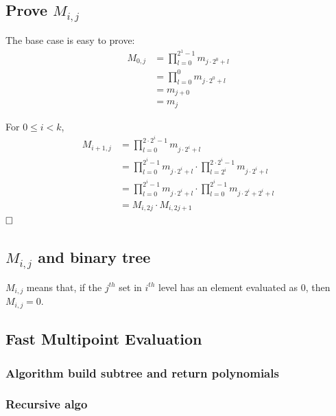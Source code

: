 \documentclass{article}
\newcommand{\qedhere}{$\hfill\ensuremath{\square}$}
\begin{document}
\subsection{Prove $M_{i,j}$}
The base case is easy to prove:
\begin{align*}
M_{0,j} &= \prod_{l=0}^{2^1-1} m_{j\cdot 2^0 + l} \\
		&= \prod_{l=0}^{0} m_{j\cdot 2^0 + l} \\
		&= m_{j+0} \\
		&= m_j
\end{align*}

For $0 \leq i < k$,
\begin{align*}
	M_{i+1,j} &= \prod_{l=0}^{2\cdot 2^i-1} m_{j\cdot 2^i+l}\\
			  &= \prod_{l=0}^{ 2^i-1} m_{j\cdot 2^i+l}\cdot \prod_{l=2^i}^{2\cdot 2^i-1} m_{j\cdot 2^i+l}\\
			  &= \prod_{l=0}^{ 2^i-1} m_{j\cdot 2^i+l}\cdot \prod_{l=0}^{ 2^i-1} m_{j\cdot 2^i+2^i+l}\\
			  &= M_{i,2j} \cdot M_{i, 2j+1}
\end{align*}
\qedhere
\subsection{$M_{i,j}$ and binary tree}
$M_{i,j}$ means that, if the $j^{th}$ set in $i^{th}$ level has an element evaluated as 0, then $M_{i,j} = 0$.
\newpage
\subsection{Fast Multipoint Evaluation}
\subsubsection*{Algorithm build subtree and return polynomials}
\begin{algorithm}
\end{algorithm}

\subsubsection*{Recursive algo}
\end{document}
